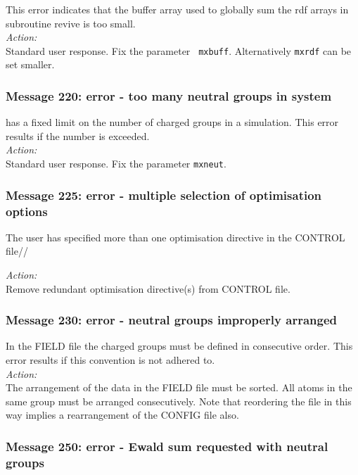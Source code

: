 This error indicates that the buffer array used to globally sum the
rdf arrays in subroutine {\sc revive} is too small. \\

\noindent
{\em Action:} \\ Standard user response. Fix the parameter {\tt
mxbuff}.  Alternatively {\tt mxrdf} can be set smaller.


\subsubsection*{Message 220: error - too many neutral groups in system}

\D{} has a fixed limit on the number of charged groups  in a simulation.
This error results if the number is exceeded. \\

\noindent
{\em Action:} \\
Standard user response. Fix the parameter {\tt mxneut}.

\subsubsection*{Message 225: error - multiple selection of optimisation options}

The user has specified more than one optimisation directive in the
CONTROL file//

\noindent
{\em Action:} \\
Remove redundant optimisation directive(s) from CONTROL file.

\subsubsection*{Message 230: error - neutral groups improperly
arranged}

In the \D{} FIELD file the charged groups  must be defined in
consecutive order. This error results if this convention is not
adhered to.\\

\noindent
{\em Action:} \\
The arrangement of the data in the FIELD file must be sorted. All
atoms in the same group must be arranged consecutively. Note that
reordering the file in this way implies a rearrangement of the
CONFIG file also.

\subsubsection*{Message 250: error - Ewald sum requested with neutral
groups}

